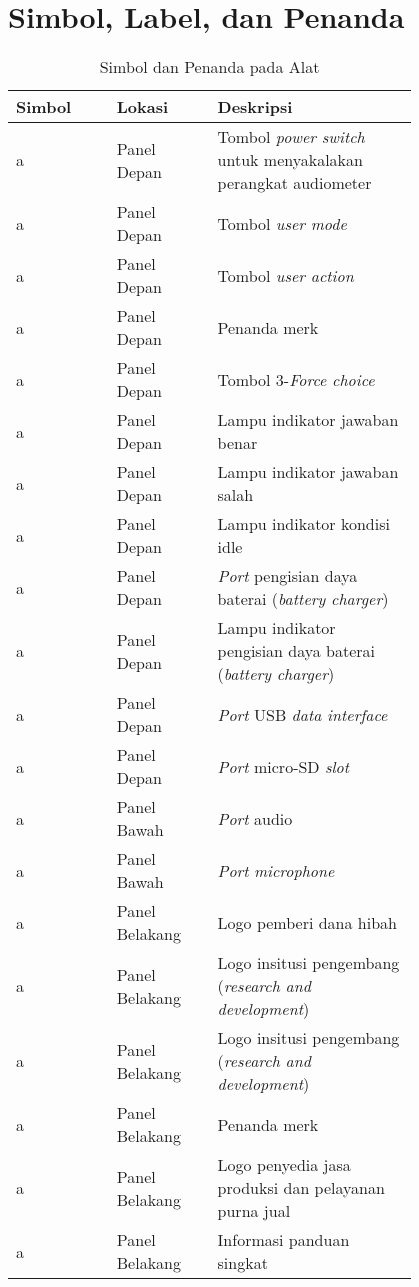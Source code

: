 \documentclass[11pt,a4paper,twoside,draft,onecolumn]{book}
\begin{document}
		\section{Simbol, Label, dan Penanda}
		\begin{table}
			\centering
			\caption{Simbol dan Penanda pada Alat}
			\label{tab:2.2}
			\begin{tabular}{|p{0.2\linewidth}  | p{0.2\linewidth}| p{0.4\linewidth}|}
				\hline
				Simbol & Lokasi & Deskripsi\\
				\hline
				\hline
				a & Panel Depan & Tombol \emph{power switch} untuk menyakalakan perangkat audiometer\\
				\hline
				a & Panel Depan & Tombol \emph{user mode}\\
				\hline
				a & Panel Depan & Tombol \emph{user action}\\
				\hline
				a & Panel Depan & Penanda merk\\
				\hline
				a & Panel Depan & Tombol 3-\emph{Force choice}\\
				\hline
				a & Panel Depan & Lampu indikator jawaban benar\\
				\hline
				a & Panel Depan & Lampu indikator jawaban salah\\
				\hline
				a & Panel Depan & Lampu indikator kondisi idle\\
				\hline
				a & Panel Depan & \emph{Port} pengisian daya baterai (\emph{battery charger})\\
				\hline
				a & Panel Depan & Lampu indikator pengisian daya baterai (\emph{battery charger})\\
				\hline
				a & Panel Depan & \emph{Port} USB \emph{data interface}\\
				\hline
				a & Panel Depan & \emph{Port} micro-SD \emph{slot}\\
				\hline
				a & Panel Bawah & \emph{Port} audio\\
				\hline
				a & Panel Bawah & \emph{Port} \emph{microphone}\\
				\hline
				a & Panel Belakang & Logo pemberi dana hibah\\
				\hline
				a & Panel Belakang & Logo insitusi pengembang (\emph{research and development})\\
				\hline
				a & Panel Belakang & Logo insitusi pengembang (\emph{research and development})\\
				\hline
				a & Panel Belakang & Penanda merk\\
				\hline
				a & Panel Belakang & Logo penyedia jasa produksi dan pelayanan purna jual\\
				\hline
				a & Panel Belakang & Informasi panduan singkat\\
				\hline
			\end{tabular}
		\end{table}
		
\end{document}
